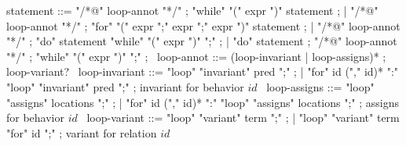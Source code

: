 \begin{syntax}
  statement ::= "/*@" loop-annot "*/" ;
  "while" "(" expr ")" statement ;
  | "/*@" loop-annot "*/" ;
  "for" "(" expr ";" expr ";" expr ")" statement ;
  | "/*@" loop-annot "*/" ;
  "do" statement "while" "(" expr ")" ";" ;
  | "do" statement ;
  "/*@" loop-annot "*/" ;
  "while" "(" expr ")" ";" ; \experimental
  \
  loop-annot ::= (loop-invariant | loop-assigns)* ;
  loop-variant?
  \
  loop-invariant ::= "loop" "invariant" pred ";" ;
  | "for" id ("," id)* ":" "loop" "invariant" pred ";" ; invariant for behavior $id$
  \
  loop-assigns ::= "loop" "assigns" locations ";" ;
  | "for" id ("," id)* ":" "loop" "assigns" locations ";" ; assigns for behavior $id$
  \
  loop-variant ::= "loop" "variant" term ";" ;
  | "loop" "variant" term "for" id ";" ; variant for relation $id$
  \
\end{syntax}

